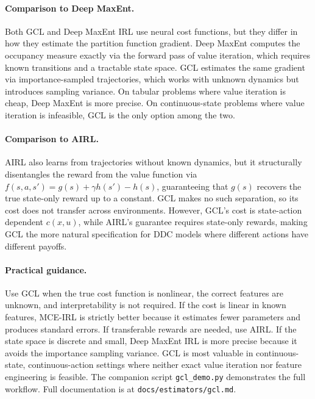 \documentclass[11pt]{article}
\begin{document}
\paragraph{Comparison to Deep MaxEnt.}
Both GCL and Deep MaxEnt IRL use neural cost functions, but they differ in how they estimate the partition function gradient.
Deep MaxEnt computes the occupancy measure exactly via the forward pass of value iteration, which requires known transitions and a tractable state space.
GCL estimates the same gradient via importance-sampled trajectories, which works with unknown dynamics but introduces sampling variance.
On tabular problems where value iteration is cheap, Deep MaxEnt is more precise.
On continuous-state problems where value iteration is infeasible, GCL is the only option among the two.

\paragraph{Comparison to AIRL.}
AIRL also learns from trajectories without known dynamics, but it structurally disentangles the reward from the value function via $f(s,a,s') = g(s) + \gamma h(s') - h(s)$, guaranteeing that $g(s)$ recovers the true state-only reward up to a constant.
GCL makes no such separation, so its cost does not transfer across environments.
However, GCL's cost is state-action dependent $c(x,u)$, while AIRL's guarantee requires state-only rewards, making GCL the more natural specification for DDC models where different actions have different payoffs.

\paragraph{Practical guidance.}
Use GCL when the true cost function is nonlinear, the correct features are unknown, and interpretability is not required.
If the cost is linear in known features, MCE-IRL is strictly better because it estimates fewer parameters and produces standard errors.
If transferable rewards are needed, use AIRL.
If the state space is discrete and small, Deep MaxEnt IRL is more precise because it avoids the importance sampling variance.
GCL is most valuable in continuous-state, continuous-action settings where neither exact value iteration nor feature engineering is feasible.
The companion script \texttt{gcl\_demo.py} demonstrates the full workflow.
Full documentation is at \texttt{docs/estimators/gcl.md}.
\end{document}
